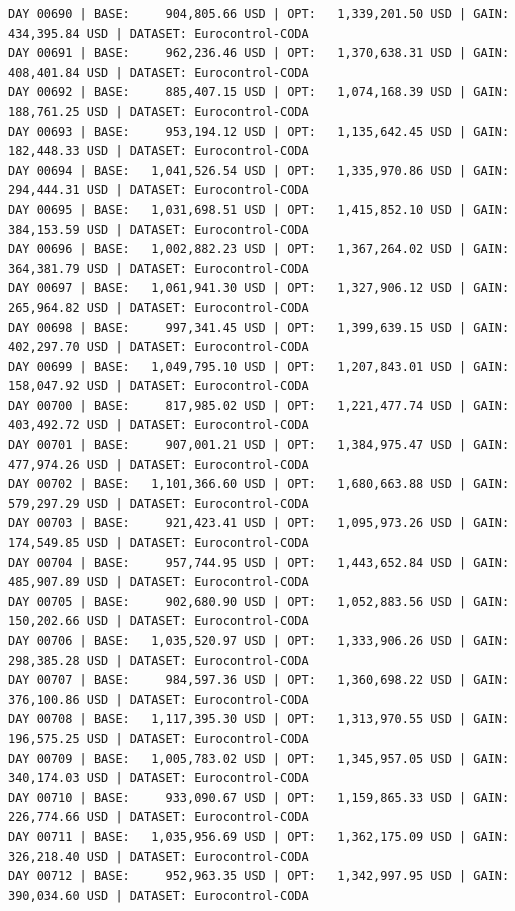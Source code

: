\documentclass[11pt,a4paper]{article}
\begin{document}
\begin{verbatim}
DAY 00690 | BASE:     904,805.66 USD | OPT:   1,339,201.50 USD | GAIN: 434,395.84 USD | DATASET: Eurocontrol-CODA
DAY 00691 | BASE:     962,236.46 USD | OPT:   1,370,638.31 USD | GAIN: 408,401.84 USD | DATASET: Eurocontrol-CODA
DAY 00692 | BASE:     885,407.15 USD | OPT:   1,074,168.39 USD | GAIN: 188,761.25 USD | DATASET: Eurocontrol-CODA
DAY 00693 | BASE:     953,194.12 USD | OPT:   1,135,642.45 USD | GAIN: 182,448.33 USD | DATASET: Eurocontrol-CODA
DAY 00694 | BASE:   1,041,526.54 USD | OPT:   1,335,970.86 USD | GAIN: 294,444.31 USD | DATASET: Eurocontrol-CODA
DAY 00695 | BASE:   1,031,698.51 USD | OPT:   1,415,852.10 USD | GAIN: 384,153.59 USD | DATASET: Eurocontrol-CODA
DAY 00696 | BASE:   1,002,882.23 USD | OPT:   1,367,264.02 USD | GAIN: 364,381.79 USD | DATASET: Eurocontrol-CODA
DAY 00697 | BASE:   1,061,941.30 USD | OPT:   1,327,906.12 USD | GAIN: 265,964.82 USD | DATASET: Eurocontrol-CODA
DAY 00698 | BASE:     997,341.45 USD | OPT:   1,399,639.15 USD | GAIN: 402,297.70 USD | DATASET: Eurocontrol-CODA
DAY 00699 | BASE:   1,049,795.10 USD | OPT:   1,207,843.01 USD | GAIN: 158,047.92 USD | DATASET: Eurocontrol-CODA
DAY 00700 | BASE:     817,985.02 USD | OPT:   1,221,477.74 USD | GAIN: 403,492.72 USD | DATASET: Eurocontrol-CODA
DAY 00701 | BASE:     907,001.21 USD | OPT:   1,384,975.47 USD | GAIN: 477,974.26 USD | DATASET: Eurocontrol-CODA
DAY 00702 | BASE:   1,101,366.60 USD | OPT:   1,680,663.88 USD | GAIN: 579,297.29 USD | DATASET: Eurocontrol-CODA
DAY 00703 | BASE:     921,423.41 USD | OPT:   1,095,973.26 USD | GAIN: 174,549.85 USD | DATASET: Eurocontrol-CODA
DAY 00704 | BASE:     957,744.95 USD | OPT:   1,443,652.84 USD | GAIN: 485,907.89 USD | DATASET: Eurocontrol-CODA
DAY 00705 | BASE:     902,680.90 USD | OPT:   1,052,883.56 USD | GAIN: 150,202.66 USD | DATASET: Eurocontrol-CODA
DAY 00706 | BASE:   1,035,520.97 USD | OPT:   1,333,906.26 USD | GAIN: 298,385.28 USD | DATASET: Eurocontrol-CODA
DAY 00707 | BASE:     984,597.36 USD | OPT:   1,360,698.22 USD | GAIN: 376,100.86 USD | DATASET: Eurocontrol-CODA
DAY 00708 | BASE:   1,117,395.30 USD | OPT:   1,313,970.55 USD | GAIN: 196,575.25 USD | DATASET: Eurocontrol-CODA
DAY 00709 | BASE:   1,005,783.02 USD | OPT:   1,345,957.05 USD | GAIN: 340,174.03 USD | DATASET: Eurocontrol-CODA
DAY 00710 | BASE:     933,090.67 USD | OPT:   1,159,865.33 USD | GAIN: 226,774.66 USD | DATASET: Eurocontrol-CODA
DAY 00711 | BASE:   1,035,956.69 USD | OPT:   1,362,175.09 USD | GAIN: 326,218.40 USD | DATASET: Eurocontrol-CODA
DAY 00712 | BASE:     952,963.35 USD | OPT:   1,342,997.95 USD | GAIN: 390,034.60 USD | DATASET: Eurocontrol-CODA

\end{verbatim}
\end{document}
